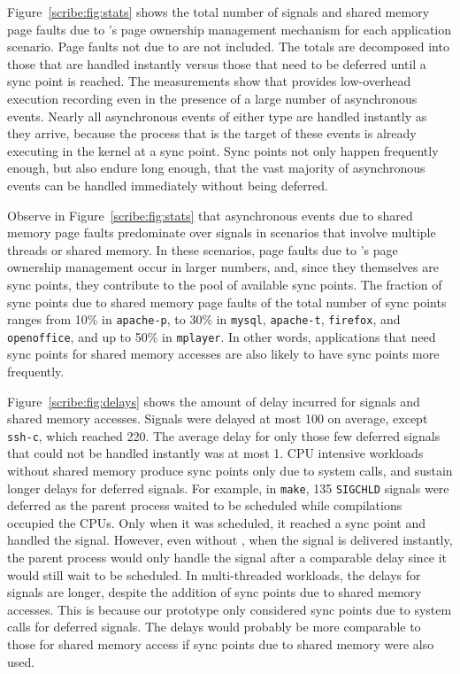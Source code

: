 Figure~\ref{scribe:fig:stats} shows the total number of signals and shared
memory page faults due to \scribe{}'s page ownership management mechanism
for each application scenario.  Page faults not due to \scribe{} are
not included.  The totals are decomposed into those that are handled
instantly versus those that need to be deferred until a sync point is
reached.  The measurements show that \scribe{} provides
low-overhead execution recording even in the presence of a large
number of asynchronous events.  
Nearly all asynchronous events of
either type are handled instantly as they arrive, because the process
that is the target of these events is already executing in the
kernel at a sync point.  Sync points not only happen frequently
enough, but also endure long enough, that the vast majority of
asynchronous events can be handled immediately without being deferred.

Observe in Figure~\ref{scribe:fig:stats} that asynchronous events due to
shared memory page faults predominate over signals in scenarios that
involve multiple threads or shared memory. In these scenarios, page
faults due to \scribe{}'s page ownership management occur in larger
numbers, and, since they themselves are sync points, they contribute
to the pool of available sync points. The fraction of sync points due
to shared memory page faults of the total number of sync points ranges
from 10\% in {\tt apache-p}, to 30\% in {\tt mysql}, {\tt apache-t},
{\tt firefox}, and {\tt openoffice}, and up to 50\% in {\tt mplayer}.
In other words, applications that need sync points for shared memory
accesses are also likely to have sync points more frequently.

Figure~\ref{scribe:fig:delays} shows the amount of delay incurred for signals
and shared memory accesses. Signals were delayed at most 100\us{}
on average, except {\tt ssh-c}, which reached 220\us{}. The average
delay for only those few deferred signals that could not be handled
instantly was at most 1\ms{}. CPU intensive workloads without shared
memory produce sync points only due to system calls, and sustain longer
delays for deferred signals.  For example, in {\tt make}, 135 {\tt SIGCHLD}
signals were deferred as the parent process waited to be scheduled
while compilations occupied the CPUs. Only when it was scheduled, it
reached a sync point and handled the signal. However, even without
\scribe{}, when the signal is delivered instantly, the parent process
would only handle the signal after a comparable delay since it would
still wait to be scheduled.  In multi-threaded workloads, the
delays for signals are longer, despite the addition of sync points due
to shared memory accesses. This is because our prototype only
considered sync points due to system calls for deferred signals. The
delays would probably be more comparable to those for shared memory
access if sync points due to shared memory were also used.

